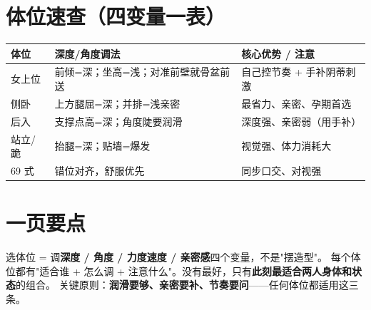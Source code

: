 \section{体位速查（四变量一表）}

\begin{tabularx}{\textwidth}{l X X}
\toprule
\textbf{体位} & \textbf{深度/角度调法} & \textbf{核心优势 / 注意} \\
\midrule
女上位 & 前倾=深；坐高=浅；对准前壁就骨盆前送 & 自己控节奏 + 手补阴蒂刺激 \\
侧卧 & 上方腿屈=深；并排=浅亲密 & 最省力、亲密、孕期首选 \\
后入 & 支撑点高=深；角度陡要润滑 & 深度强、亲密弱（用手补） \\
站立/跪 & 抬腿=深；贴墙=爆发 & 视觉强、体力消耗大 \\
69 式 & 错位对齐，舒服优先 & 同步口交、对视强 \\
\bottomrule
\end{tabularx}

\section{一页要点}
选体位 = 调\textbf{深度 / 角度 / 力度速度 / 亲密感}四个变量，不是"摆造型"。
每个体位都有"适合谁 + 怎么调 + 注意什么"。没有最好，只有\textbf{此刻最适合两人身体和状态}的组合。
关键原则：\textbf{润滑要够、亲密要补、节奏要问}——任何体位都适用这三条。


